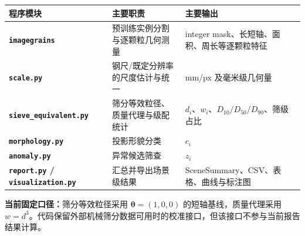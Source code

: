 \documentclass[UTF8,a4paper,landscape,10.5pt,fontset=fandol]{ctexart}
\begin{document}
\begin{center}
\end{center}

\vspace{0.45em}

\begin{tabularx}{\linewidth}{>{\bfseries}p{4.2cm} Y Y}
\toprule
程序模块 & 主要职责 & 主要输出 \\
\midrule
\texttt{imagegrains} & 预训练实例分割与逐颗粒几何测量 & integer mask、长短轴、面积、周长等逐颗粒特征 \\
\texttt{scale.py} & 钢尺/既定分辨率的尺度估计与统一 & mm/px 及毫米级几何量 \\
\texttt{sieve\_equivalent.py} & 筛分等效粒径、质量代理与级配统计 & $d_i$、$w_i$、$D_{10}/D_{50}/D_{90}$、筛级占比 \\
\texttt{morphology.py} & 投影形貌分类 & $c_i$ \\
\texttt{anomaly.py} & 异常候选筛查 & $z_i$ \\
\texttt{report.py} / \texttt{visualization.py} & 汇总并导出场景级结果 & SceneSummary、CSV、表格、曲线与标注图 \\
\bottomrule
\end{tabularx}

\vspace{0.55em}
{\small
\textbf{当前固定口径：}筛分等效粒径采用 $\boldsymbol{\theta}=(1,0,0)$ 的短轴基线，质量代理采用 $w=d^3$。代码保留外部机械筛分数据可用时的校准接口，但该接口不参与当前报告结果计算。}
\end{document}
